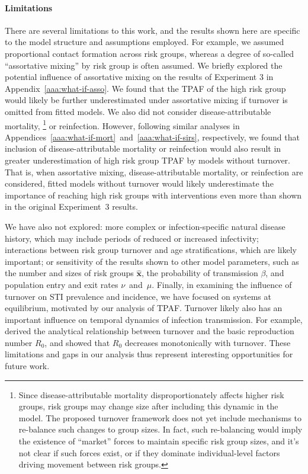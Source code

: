 \paragraph{Limitations}
There are several limitations to this work,
and the results shown here
are specific to the model structure and assumptions employed.
For example,
we assumed proportional contact formation across risk groups,
whereas a degree of so-called ``assortative mixing''
by risk group is often assumed.
We briefly explored the potential influence of assortative mixing
on the results of Experiment 3 in Appendix~\ref{aaa:what-if-asso}.
We found that the TPAF of the high risk group
would likely be further underestimated under assortative mixing
if turnover is omitted from fitted models.
We also did not consider disease-attributable mortality,%
\footnote{Since disease-attributable mortality
  disproportionately affects higher risk groups,
  risk groups may change size after including this dynamic in the model.
  The proposed turnover framework does not yet include mechanisms to
  re-balance such changes to group sizes.
  In fact, such re-balancing would imply the existence of ``market'' forces
  to maintain specific risk group sizes,
  and it's not clear if such forces exist,
  or if they dominate individual-level factors
  driving movement between risk groups.}
or reinfection.
However, following similar analyses in
Appendices~\ref{aaa:what-if-mort}~and~\ref{aaa:what-if-sirs}, respectively,
we found that inclusion of disease-attributable mortality or reinfection would
also result in greater underestimation of high risk group TPAF
by models without turnover.
That is, when
assortative mixing, disease-attributable mortality, or reinfection are considered,
fitted models without turnover would likely underestimate
the importance of reaching high risk groups with interventions
even more than shown in the original Experiment~3 results.
\par
We have also not explored:
more complex or infection-specific natural disease history,
which may include periods of reduced or increased infectivity;
interactions between risk group turnover and age stratifications,
which are likely important;
or sensitivity of the results shown to other model parameters,
such as the number and sizes of risk groups $\bm{\hat{x}}$,
the probability of transmission $\beta$,
and population entry and exit rates $\nu$~and~$\mu$.
Finally, in examining the influence of turnover on STI prevalence and incidence,
we have focused on systems at equilibrium,
motivated by our analysis of TPAF.
Turnover likely also has an important influence on
temporal dynamics of infection transmission.
For example, \citet{Henry2015} derived
the analytical relationship between turnover
and the basic reproduction number $R_0$,
and showed that $R_0$ decreases monotonically with turnover.
These limitations and gaps in our analysis thus represent
interesting opportunities for future work.